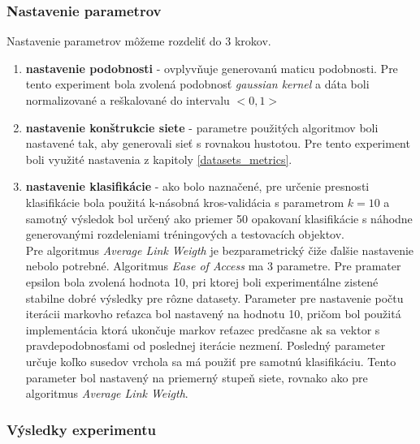 \documentclass[slovak,master,dept460,male,cpp,cpdeclaration]{diploma}
\begin{document}
\subsubsection{Nastavenie parametrov}
Nastavenie parametrov môžeme rozdeliť do 3 krokov.
\begin{enumerate}
\item \textbf{nastavenie podobnosti} - ovplyvňuje generovanú maticu podobnosti. Pre tento experiment bola zvolená podobnosť \textit{gaussian kernel} a dáta boli normalizované a reškalované do intervalu $<0,1>$
\item \textbf{nastavenie konštrukcie siete} - parametre použitých algoritmov boli nastavené tak, aby generovali sieť s rovnakou hustotou. Pre tento experiment boli využité nastavenia z kapitoly \ref{datasets_metrics}.

\item \textbf{nastavenie klasifikácie} - ako bolo naznačené, pre určenie presnosti klasifikácie bola použitá k-násobná kros-validácia s parametrom $k=10$ a samotný výsledok bol určený ako priemer 50 opakovaní klasifikácie s náhodne generovanými rozdeleniami tréningových a testovacích objektov. \\ Pre algoritmus \textit{Average Link Weigth} je bezparametrický čiže ďalšie nastavenie nebolo potrebné. Algoritmus \textit{Ease of Access} ma 3 parametre. Pre pramater epsilon bola zvolená hodnota 10, pri ktorej boli experimentálne zistené \cite{easeofaccess} stabilne dobré výsledky pre rôzne datasety. Parameter pre nastavenie počtu iterácii markovho reťazca bol nastavený na hodnotu 10, pričom bol použitá implementácia ktorá ukončuje markov reťazec predčasne ak sa vektor s pravdepodobnosťami od poslednej iterácie nezmení.  Posledný parameter určuje koľko susedov vrchola sa má použiť pre samotnú klasifikáciu. Tento parameter bol nastavený na priemerný stupeň siete, rovnako ako pre algoritmus \textit{Average Link Weigth}.
\end{enumerate}

\subsubsection{Výsledky experimentu}
\end{document}
